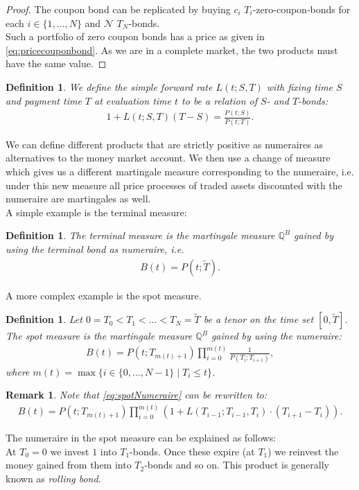 \documentclass[12pt]{article}
\newtheorem{remark}[theorem]{Remark}
\newtheorem{definition}[theorem]{Definition}
\begin{document}
	\begin{proof}
		The coupon bond can be replicated by buying $c_i$ $T_i$-zero-coupon-bonds for each $i\in \{1, ...,N\}$ and $\mathcal{N}$  $T_N$-bonds.\\
		Such a portfolio of zero coupon bonds has a price as given in \cref{eq:pricecouponbond}. As we are in a complete market, the two products must have the same value.
	\end{proof}
	\begin{definition}\label{def:simpleFR}
		We define the \emph{simple forward rate} $L(t;S,T)$ with fixing time $S$ and payment time $T$ at evaluation time $t$ to be a relation of $S$- and $T$-bonds:
		\begin{align}
			1 + L(t;S,T)(T - S) = \frac{P(t;S)}{P(t;T)}.
		\end{align}
	\end{definition}
	We can define different products that are strictly positive as numeraires as alternatives to the money market account. We then use a change of measure which gives us a different martingale measure corresponding to the numeraire, i.e. under this new measure all price processes of traded assets discounted with the numeraire are martingales as well.\\
	A simple example is the terminal measure:
	\begin{definition}
		The \emph{terminal measure} is the martingale measure $\mathbb{Q}^B$ gained by using the terminal bond as numeraire, i.e. 
		\begin{align}\label{eq:terminalNumeraire}
			B(t) = P(t;\tilde{T}).
		\end{align}
	\end{definition}
	A more complex example is the spot measure.
	\begin{definition}
		Let $0 = T_0 < T_1 < ... < T_N = \tilde{T}$ be a tenor on the time set $[0,\tilde{T}]$.\\
		The \emph{spot measure} is the martingale measure $\mathbb{Q}^B$ gained by using the numeraire:
		\begin{align}\label{eq:spotNumeraire}
			B(t) = P(t;T_{m(t)+1})\prod_{i=0}^{m(t)}\frac{1}{P(T_{i};T_{i+1})},
		\end{align}
		where $m(t) = \max\{i \in \{0, ..., N-1\} \; | \; T_i \le t \}$.
	\end{definition}
	\begin{remark}
		Note that \cref{eq:spotNumeraire} can be rewritten to:
		\begin{align}\label{eq:spotNumeraireAlt}
			B(t) = P(t;T_{m(t)+1})\prod_{i=0}^{m(t)}\left(1 + L\left(T_{i-1};T_{i-1},T_i\right)\cdot\left(T_{i+1}-T_i\right)\right).
		\end{align}
	\end{remark}
	The numeraire in the spot measure can be explained as follows:\\
	At $T_0 = 0$ we invest $1$ into $T_1$-bonds. Once these expire (at $T_1$) we reinvest the money gained from them into $T_2$-bonds and so on.
	This product is generally known as \emph{rolling bond}.\\
	
\end{document}
